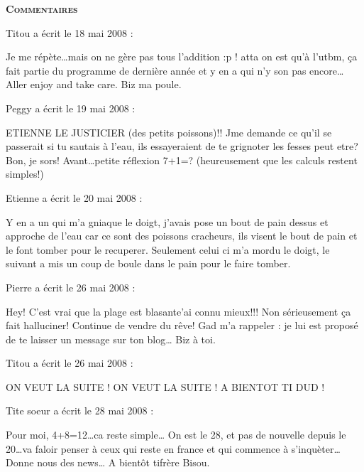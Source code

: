 \bigskip
\textbf{\textsc{Commentaires}}

\medskip
Titou a écrit le 18 mai 2008 :
\begin{displayquote}
Je me répète\dots mais on ne gère pas tous l'addition :p ! atta on est qu'à l'utbm, ça fait partie du programme de dernière année  et y en a qui n'y son pas encore\dots
Aller enjoy and take care. Biz ma poule.
\end{displayquote}

\medskip
Peggy a écrit le 19 mai 2008 :
\begin{displayquote}
ETIENNE LE JUSTICIER (des petits poissons)!!
Jme demande ce qu'il se passerait si tu sautais à l'eau, ils essayeraient de te grignoter les fesses peut etre?
Bon, je sors!
Avant\dots petite réflexion 7+1=? (heureusement que les calculs restent simples!)
\end{displayquote}

\medskip
Etienne a écrit le 20 mai 2008 :
\begin{displayquote}
Y en a un qui m'a gniaque le doigt, j'avais pose un bout de pain dessus et approche de l'eau car ce sont des poissons cracheurs, ils visent le bout de pain et le font tomber pour le recuperer. Seulement celui ci m'a mordu le doigt, le suivant a mis un coup de boule dans le pain pour le faire tomber.
\end{displayquote}

\medskip
Pierre a écrit le 26 mai 2008 :
\begin{displayquote}
Hey!
C'est vrai que la plage est blasante\dotsj'ai connu mieux!!!
Non sérieusement ça fait halluciner!
Continue de vendre du rêve!
Gad m'a rappeler : je lui est proposé de te laisser un message sur ton blog\dots
Biz à toi.
\end{displayquote}

\medskip
Titou a écrit le 26 mai 2008 :
\begin{displayquote}
ON VEUT LA SUITE ! ON VEUT LA SUITE !
A BIENTOT TI DUD !
\end{displayquote}

\medskip
Tite soeur a écrit le 28 mai 2008 :
\begin{displayquote}
Pour moi, 4+8=12\dots ca reste simple\dots
On est le 28, et pas de nouvelle depuis le 20\dots va faloir penser à ceux qui reste en france et qui commence à s'inquèter\dots
Donne nous des news\dots
A bientôt tifrère
Bisou.
\end{displayquote}

\vfill
